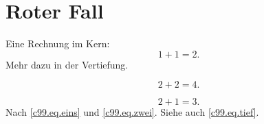 \chapter{Roter Fall}\label{c99}

Eine Rechnung im Kern:
\begin{equation}\label{c99.eq.eins}
  1 + 1 = 2.
\end{equation}
Mehr dazu in der Vertiefung.

\begin{vertiefung}[id=c99.v1, titel={Tiefer}, wozu={Zeigt eine zweite Rechnung.},
    voraussetzung={Gleichung~\eqref{c99.eq.eins}.}, zurueck={Es bleibt bei zwei.}]
  \begin{equation}\label{c99.eq.tief}
    2 + 2 = 4.
  \end{equation}
\end{vertiefung}

\begin{equation}\label{c99.eq.zwei}
  2 + 1 = 3.
\end{equation}
Nach \eqref{c99.eq.eins} und \eqref{c99.eq.zwei}. Siehe auch \eqref{c99.eq.tief}.
